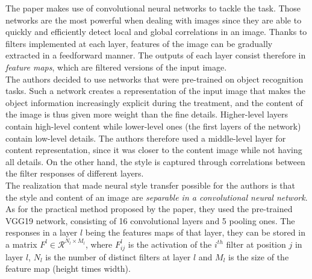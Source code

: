 \documentclass[twocolumn,superscriptaddress,aps,floatfix,nofootinbib]{revtex4-1}
\begin{document}
    The paper \cite{DBLP:journals/corr/GatysEB15a} makes use of convolutional neural networks to tackle the task. Those networks are the most powerful when dealing with images since they are able to quickly and efficiently detect local and global correlations in an image. Thanks to filters implemented at each layer, features of the image can be gradually extracted in a feedforward manner. The outputs of each layer consist therefore in \emph{feature maps}, which are filtered versions of the input image.\\
    
    The authors decided to use networks that were pre-trained on object recognition tasks. Such a network creates a representation of the input image that makes the object information increasingly explicit during the treatment, and the content of the image is thus given more weight than the fine details. Higher-level layers contain high-level content while lower-level ones (the first layers of the network) contain low-level details. The authors therefore used a middle-level layer for content representation, since it was closer to the content image while not having all details. On the other hand, the style is captured through correlations between the filter responses of different layers.\\
    
    The realization that made neural style transfer possible for the authors is that the style and content of an image are \emph{separable in a convolutional neural network}.\\
    
    As for the practical method proposed by the paper, they used the pre-trained VGG19 network, consisting of 16 convolutional layers and 5 pooling ones. The responses in a layer $l$ being the features maps of that layer, they can be stored in a matrix $F^l \in \mathcal{R}^{N_l\times M_l}$, where $F_{ij}^l$ is the activation of the $i^{th}$ filter at position $j$ in layer $l$, $N_l$ is the number of distinct filters at layer $l$ and $M_l$ is the size of the feature map (height times width).\\ 
    
\end{document}
